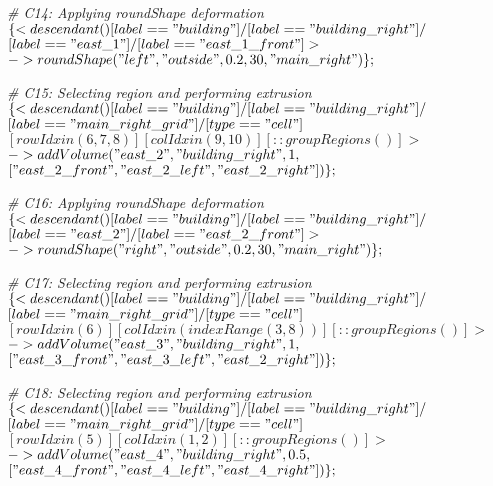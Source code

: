 \noindent \textit{\# C14: Applying roundShape deformation} \\
$\{< descendant() [label=="building"] / [label=="building\_right"] / $\\
$[label=="east\_1"] / [label=="east\_1\_front"] > $\\
$-> roundShape("left", "outside", 0.2, 30, "main\_right")\};$

\noindent \textit{\# C15: Selecting region and performing extrusion} \\
$\{< descendant() [label=="building"] / [label=="building\_right"] / $\\
$[label=="main\_right\_grid"] / [type=="cell"] $\\
$[rowIdx in (6, 7, 8)] [colIdx in (9, 10)] [::groupRegions()] > $\\
$-> addVolume("east\_2", "building\_right", 1, $\\
$["east\_2\_front", "east\_2\_left", "east\_2\_right"])\};$

\noindent \textit{\# C16: Applying roundShape deformation} \\
$\{< descendant() [label=="building"] / [label=="building\_right"] / $\\
$[label=="east\_2"] / [label=="east\_2\_front"] > $\\
$-> roundShape("right", "outside", 0.2, 30, "main\_right")\};$

\noindent \textit{\# C17: Selecting region and performing extrusion} \\
$\{< descendant() [label=="building"] / [label=="building\_right"] / $\\
$[label=="main\_right\_grid"] / [type=="cell"] $\\
$[rowIdx in (6)] [colIdx in (indexRange(3, 8))] [::groupRegions()] > $\\
$-> addVolume("east\_3", "building\_right", 1, $\\
$["east\_3\_front", "east\_3\_left", "east\_2\_right"])\};$

\noindent \textit{\# C18: Selecting region and performing extrusion} \\
$\{< descendant() [label=="building"] / [label=="building\_right"] / $\\
$[label=="main\_right\_grid"] / [type=="cell"] $\\
$[rowIdx in (5)] [colIdx in (1, 2)] [::groupRegions()] > $\\
$-> addVolume("east\_4", "building\_right", 0.5, $\\
$["east\_4\_front", "east\_4\_left", "east\_4\_right"])\};$

